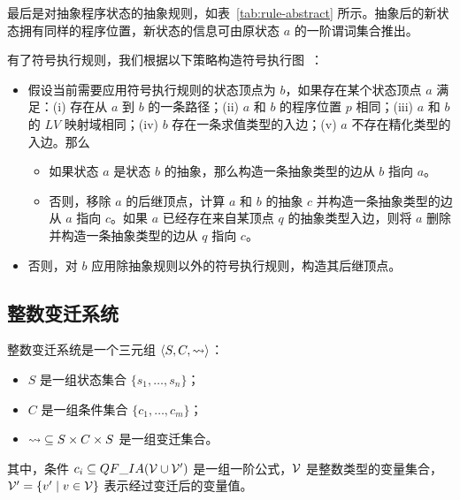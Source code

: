 最后是对抽象程序状态的抽象规则，如表~\ref{tab:rule-abstract} 所示。抽象后的新状态拥有同样的程序位置，新状态的信息可由原状态 $a$ 的一阶谓词集合推出。

有了符号执行规则，我们根据以下策略构造符号执行图~\cite{DBLP:conf/cade/StroderGBFFHS14,DBLP:journals/jar/StroderGBFFHSA17}：
\begin{itemize}
\item 
假设当前需要应用符号执行规则的状态顶点为 $b$，如果存在某个状态顶点 $a$ 满足：(i) 存在从 $a$ 到 $b$ 的一条路径；(ii) $a$ 和 $b$ 的程序位置 $p$ 相同；(iii) $a$ 和 $b$ 的 $LV$ 映射域相同；(iv) $b$ 存在一条求值类型的入边；(v) $a$ 不存在精化类型的入边。那么
\begin{itemize}
\item 如果状态 $a$ 是状态 $b$ 的抽象，那么构造一条抽象类型的边从 $b$ 指向 $a$。
\item 否则，移除 $a$ 的后继顶点，计算 $a$ 和 $b$ 的抽象 $c$ 并构造一条抽象类型的边从 $a$ 指向 $c$。如果 $a$ 已经存在来自某顶点 $q$ 的抽象类型入边，则将 $a$ 删除并构造一条抽象类型的边从 $q$ 指向 $c$。
\end{itemize}
\item
否则，对 $b$ 应用除抽象规则以外的符号执行规则，构造其后继顶点。
\end{itemize}

\subsection{整数变迁系统}

\begin{definition}
整数变迁系统是一个三元组 $\langle S, C, \rightsquigarrow \rangle$：
\begin{itemize}
\item $S$ 是一组状态集合 $\{s_1,\ldots,s_n\}$；
\item $C$ 是一组条件集合 $\{c_1,\ldots,c_m\}$；
\item ${\rightsquigarrow} \subseteq S \times C \times S$ 是一组变迁集合。
\end{itemize}
其中，条件 $c_i \subseteq QF\_IA(\mathcal{V}\cup\mathcal{V}')$ 是一组一阶公式，$\mathcal{V}$ 是整数类型的变量集合，$\mathcal{V}' = \{v' \mid v\in\mathcal{V} \}$ 表示经过变迁后的变量值。
\end{definition}

